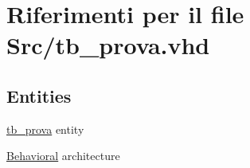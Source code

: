 \hypertarget{tb__prova_8vhd}{\section{Riferimenti per il file Src/tb\+\_\+prova.vhd}
\label{tb__prova_8vhd}
}
\subsection*{Entities}
\begin{DoxyCompactItemize}
\item 
\hyperlink{classtb__prova}{tb\+\_\+prova} entity
\item 
\hyperlink{classtb__prova_1_1_behavioral}{Behavioral} architecture
\end{DoxyCompactItemize}
